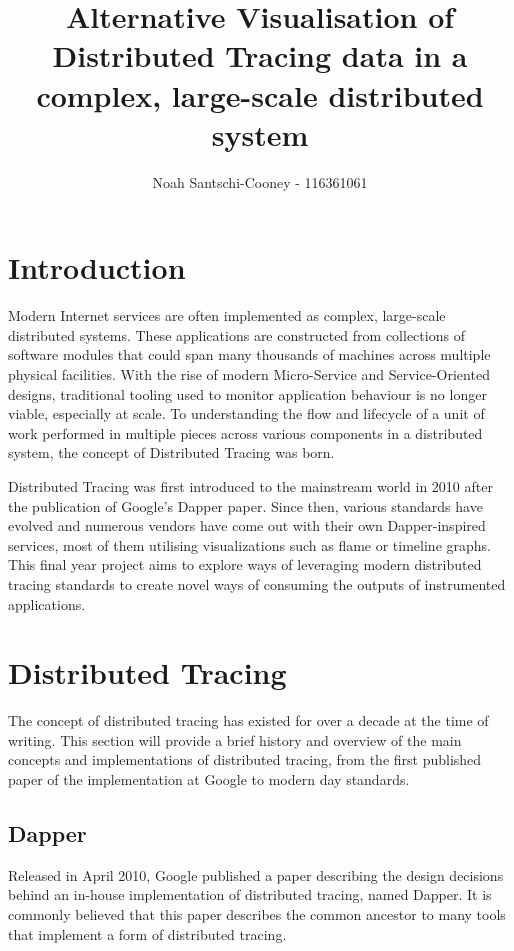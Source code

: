 \documentclass[pdftex,titlepage]{article}
\author{Noah Santschi-Cooney - 116361061}
\title{\textbf{Alternative Visualisation of Distributed Tracing data in a complex, large-scale distributed system}}
\begin{document}
    \maketitle
    \section{Introduction}

    Modern Internet services are often implemented as complex, large-scale distributed systems. 
    These applications are constructed from collections of software modules that could span many
    thousands of machines across multiple physical facilities. With the rise of modern 
    Micro-Service and Service-Oriented designs, traditional tooling used to monitor application 
    behaviour is no longer viable, especially at scale. To understanding the flow and lifecycle 
    of a unit of work performed in multiple pieces across various components in a distributed system, 
    the concept of Distributed Tracing was born. 
    
    Distributed Tracing was first introduced to the mainstream world in 2010 after the publication
    of Google’s Dapper paper. Since then, various standards have evolved and numerous vendors have
    come out with their own Dapper-inspired services, most of them utilising visualizations such as
    flame or timeline graphs. This final year project aims to explore ways of leveraging modern 
    distributed tracing standards to create novel ways of consuming the outputs of instrumented applications.

    \section{Distributed Tracing}
    The concept of distributed tracing has existed for over a decade at the time of writing. 
    This section will provide a brief history and overview of the main concepts and implementations of distributed tracing,
    from the first published paper of the implementation at Google to modern day standards.

        \subsection{Dapper}
        Released in April 2010,
        Google published a paper describing the design decisions behind an in-house implementation of distributed tracing,
        named Dapper. It is commonly believed that this paper describes the common ancestor to many tools that implement
        a form of distributed tracing.
\end{document}
